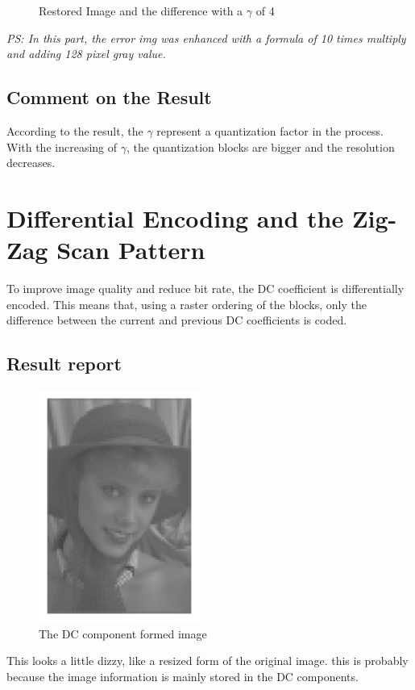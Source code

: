 \documentclass[paper=a4, fontsize=11pt]{scrartcl} %
\numberwithin{equation}{section} %
\numberwithin{figure}{section} %
\numberwithin{table}{section} %
\begin{document}
\begin{figure}[H]
	\caption{Restored Image and the difference with a $\gamma$ of 4}
	
\end{figure}
\emph{PS: In this part, the error img was enhanced with a formula of 10 times multiply and adding 128 pixel gray value. }
\subsection{Comment on the Result}
According to the result, the $\gamma$ represent a quantization factor in the process. With the increasing of $\gamma$, the quantization blocks are bigger and the resolution decreases.

\section{Differential Encoding and the Zig-Zag Scan Pattern
}
To improve image quality and reduce bit rate, the DC coefficient is differentially encoded.
This means that, using a raster ordering of the blocks, only the difference between the current
and previous DC coefficients is coded.

\subsection{Result report} 
\begin{figure}[H]
	
	\centering
	\includegraphics[height =3in]{DC.eps}
	\caption{The DC component formed image}
	
	
	
\end{figure}
This looks a little dizzy, like a resized form of the original image. this is probably because the image information is mainly stored in the DC components. 
\\
 
\end{document}
